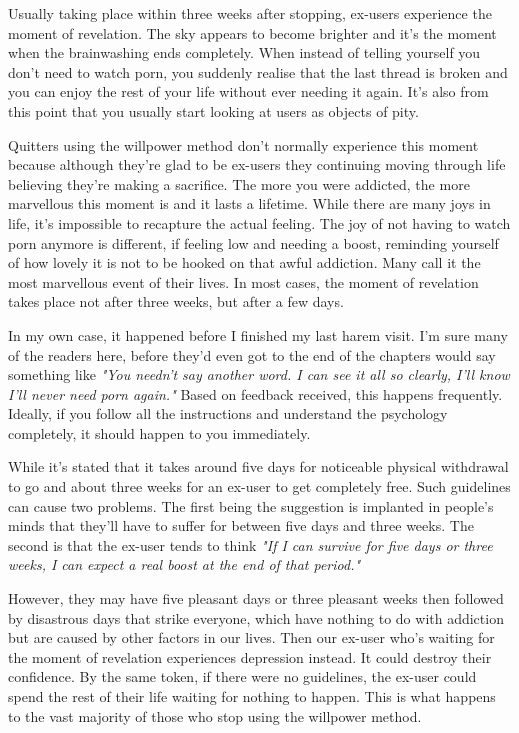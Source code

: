 \documentclass[easypeasy.tex]{subfiles}
\begin{document}
Usually taking place within three weeks after stopping, ex-users experience the moment of revelation. The sky appears to become brighter and it's the moment when the brainwashing ends completely. When instead of telling yourself you don't need to watch porn, you suddenly realise that the last thread is broken and you can enjoy the rest of your life without ever needing it again. It's also from this point that you usually start looking at users as objects of pity.

Quitters using the willpower method don't normally experience this moment because although they're glad to be ex-users they continuing moving through life believing they're making a sacrifice. The more you were addicted, the more marvellous this moment is and it lasts a lifetime. While there are many joys in life, it's impossible to recapture the actual feeling. The joy of not having to watch porn anymore is different, if feeling low and needing a boost, reminding yourself of how lovely it is not to be hooked on that awful addiction. Many call it the most marvellous event of their lives. In most cases, the moment of revelation takes place not after three weeks, but after a few days. 

In my own case, it happened before I finished my last harem visit. I'm sure many of the readers here, before they'd even got to the end of the chapters would say something like \textit{"You needn't say another word. I can see it all so clearly, I'll know I'll never need porn again."} Based on feedback received, this happens frequently. Ideally, if you follow all the instructions and understand the psychology completely, it should happen to you immediately.

While it's stated that it takes around five days for noticeable physical withdrawal to go and about three weeks for an ex-user to get completely free. Such guidelines can cause two problems. The first being the suggestion is implanted in people's minds that they'll have to suffer for between five days and three weeks. The second is that the ex-user tends to think \textit{"If I can survive for five days or three weeks, I can expect a real boost at the end of that period."}

However, they may have five pleasant days or three pleasant weeks then followed by disastrous days that strike everyone, which have nothing to do with addiction but are caused by other factors in our lives. Then our ex-user who's waiting for the moment of revelation experiences depression instead. It could destroy their confidence. By the same token, if there were no guidelines, the ex-user could spend the rest of their life waiting for nothing to happen. This is what happens to the vast majority of those who stop using the willpower method.
\end{document}

